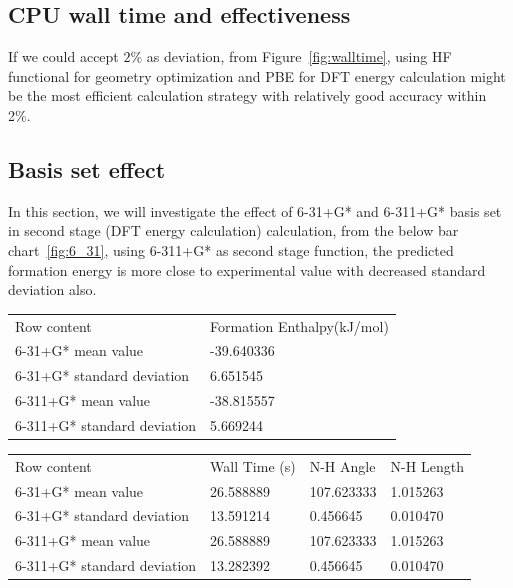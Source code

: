 \documentclass{article}
\begin{document}
\subsection{CPU wall time and effectiveness}
If we could accept $2\%$ as deviation, from Figure~\ref{fig:walltime}, using HF functional for geometry optimization and PBE for DFT energy calculation might be the most efficient calculation strategy with relatively good accuracy within 2\%. 

\subsection{Basis set effect}
In this section, we will investigate the effect of 6-31+G* and 6-311+G* basis set in second stage (DFT energy calculation) calculation, from the below bar chart~\ref{fig:6_31}, using 6-311+G* as second stage function, the predicted formation energy is more close to experimental value with decreased standard deviation also. 

\begin{tabular}{ll}
Row content & Formation Enthalpy(kJ/mol) \\
6-31+G* mean value & -39.640336 \\
6-31+G* standard deviation & 6.651545 \\ 
6-311+G* mean value & -38.815557\\
6-311+G* standard deviation & 5.669244 \\ 
\end{tabular}

\begin{tabular}{llll}
Row content & Wall Time (s) & N-H Angle & N-H Length\\
6-31+G* mean value & 26.588889 & 107.623333 & 1.015263 \\
6-31+G* standard deviation & 13.591214 &   0.456645 & 0.010470\\ 
6-311+G* mean value & 26.588889 & 107.623333 & 1.015263 \\
6-311+G* standard deviation & 13.282392 &  0.456645 & 0.010470\\ 
\end{tabular}

\end{document}
